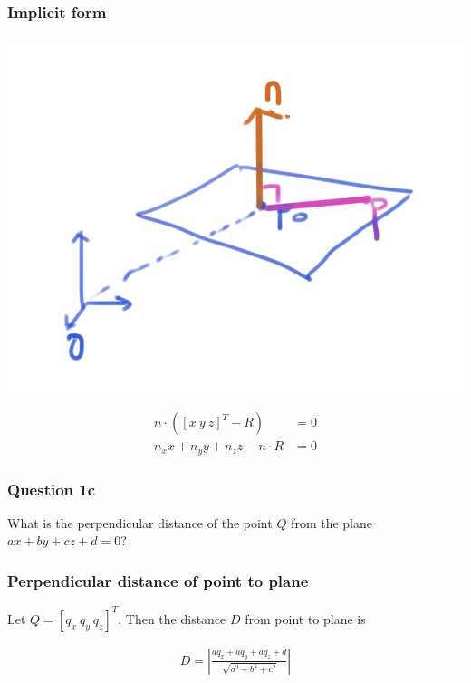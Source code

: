 \documentclass{beamer}
\begin{document}
\begin{frame}
    \frametitle{Implicit form}

    \begin{center}
        \includegraphics[scale=0.4]{plane-def.png}

        \begin{eqnarray}
            n \cdot ([x \  y \  z]^T - R) &= 0 \\ 
            n_x x + n_y y + n_z z - n\cdot R &= 0
        \end{eqnarray}
    \end{center}

\end{frame}

\begin{frame}
    \frametitle{Question 1c}
    
    What is the perpendicular distance of the point $Q$ from the plane $ax + by + cz + d = 0$?

\end{frame}

\begin{frame}
    \frametitle{Perpendicular distance of point to plane}

    Let $Q = [q_x \  q_y \  q_z]^T$. Then the distance $D$ from point to plane is 

    \begin{eqnarray}
        D = \left| \frac{aq_x + aq_y + aq_z + d}{\sqrt{a^2 + b^2 + c^2}}\right|
    \end{eqnarray}

\end{frame}
\end{document}
